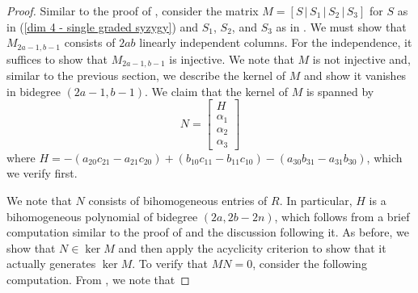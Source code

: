 \documentclass[reqno]{amsart}
\numberwithin{equation}{section}
\theoremstyle{definition}
\begin{document}
\begin{proof}
Similar to the proof of , consider the matrix $M=[S\,|\,S_1\,|\,S_2\,|\,S_3]$ for $S$ as in (\ref{dim 4 - single graded syzygy}) and $S_1$, $S_2$, and $S_3$ as in . We must show that $M_{2a-1,b-1}$ consists of $2ab$ linearly independent columns. For the independence, it suffices to show that $M_{2a-1,b-1}$ is injective. We note that $M$ is not injective and, similar to the previous section, we describe the kernel of $M$ and show it vanishes in bidegree $(2a-1,b-1)$. We claim that the kernel of $M$ is spanned by 
\begin{equation}\label{dim 4 - N defn}
N=\left[
\begin{array}{c}
     H\\
      \alpha_1\\
      \alpha_2\\
      \alpha_3
\end{array}
\right]
\end{equation}
where $H= -(a_{20}c_{21}-a_{21}c_{20})+(b_{10}c_{11}-b_{11}c_{10})-(a_{30}b_{31}-a_{31}b_{30})$, which we verify first.

We note that $N$ consists of bihomogeneous entries of $R$. In particular, $H$ is a bihomogeneous polynomial of bidegree $(2a,2b-2n)$, which follows from a brief computation similar to the proof of  and the discussion following it. As before, we show that $N \in \ker M$ and then apply the acyclicity criterion \cite[Cor. 1]{BE73} to show that it actually generates $\ker M$. To verify that $MN=0$, consider the following computation. From , we note that


\end{proof}
\end{document}
